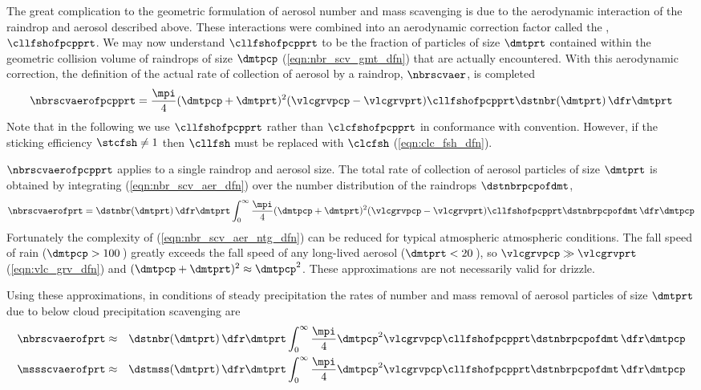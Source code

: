 \documentclass[12pt,twoside]{book}
\begin{document}
The great complication to the geometric formulation of aerosol number
and mass scavenging is due to the aerodynamic interaction of the
raindrop and aerosol described above.
These interactions were combined into an aerodynamic correction factor
called the , $\cllfshofpcpprt$.
We may now understand $\cllfshofpcpprt$ to be the fraction of
particles of size $\dmtprt$ contained within the geometric collision
volume of raindrops of size $\dmtpcp$ (\ref{eqn:nbr_scv_gmt_dfn}) that
are actually encountered.  
With this aerodynamic correction, the definition of the actual rate of
collection of aerosol by a raindrop, $\nbrscvaer$, is completed
\begin{equation}
\nbrscvaerofpcpprt = \frac{\mpi}{4} ( \dmtpcp + \dmtprt )^{2} (\vlcgrvpcp -
\vlcgrvprt) \cllfshofpcpprt \dstnbr(\dmtprt) \,\dfr\dmtprt
\label{eqn:nbr_scv_aer_dfn}
\end{equation}
Note that in the following we use $\cllfshofpcpprt$ rather than
$\clcfshofpcpprt$ in conformance with convention. 
However, if the sticking efficiency $\stcfsh \ne 1$ then
$\cllfsh$ must be replaced with $\clcfsh$ (\ref{eqn:clc_fsh_dfn}).

$\nbrscvaerofpcpprt$ applies to a single raindrop and aerosol size.
The total rate of collection of aerosol particles of size $\dmtprt$ is
obtained by integrating (\ref{eqn:nbr_scv_aer_dfn}) over the number
distribution of the raindrops $\dstnbrpcpofdmt$,
\begin{equation}
\nbrscvaerofprt = \dstnbr(\dmtprt) \,\dfr\dmtprt
\int_{0}^{\infty} \frac{\mpi}{4} 
( \dmtpcp + \dmtprt )^{2} (\vlcgrvpcp - \vlcgrvprt) 
\cllfshofpcpprt \dstnbrpcpofdmt \,\dfr\dmtpcp
\label{eqn:nbr_scv_aer_ntg_dfn}
\end{equation}
Fortunately the complexity of (\ref{eqn:nbr_scv_aer_ntg_dfn}) can be 
reduced for typical atmospheric atmospheric conditions.
The fall speed of rain ($\dmtpcp > 100$\,\um) greatly exceeds 
the fall speed of any long-lived aerosol ($\dmtprt < 20$\,\um), so
$\vlcgrvpcp \gg \vlcgrvprt$ (\ref{eqn:vlc_grv_dfn}) and
$( \dmtpcp + \dmtprt )^{2} \approx \dmtpcp^{2}$.
These approximations are not necessarily valid for drizzle.

Using these approximations, in conditions of steady precipitation the
rates of number and mass removal of aerosol particles of size
$\dmtprt$ due to below cloud precipitation scavenging are
\begin{eqnarray}
\nbrscvaerofprt & \approx & \dstnbr(\dmtprt) \,\dfr\dmtprt
\int_{0}^{\infty} \frac{\mpi}{4} 
\dmtpcp^{2} \vlcgrvpcp
\cllfshofpcpprt \dstnbrpcpofdmt \,\dfr\dmtpcp \nonumber \\
\mssscvaerofprt & \approx & \dstmss(\dmtprt) \,\dfr\dmtprt
\int_{0}^{\infty} \frac{\mpi}{4} 
\dmtpcp^{2} \vlcgrvpcp
\cllfshofpcpprt \dstnbrpcpofdmt \,\dfr\dmtpcp
\label{eqn:mss_scv_aer_dfn}
\end{eqnarray}
\end{document}
